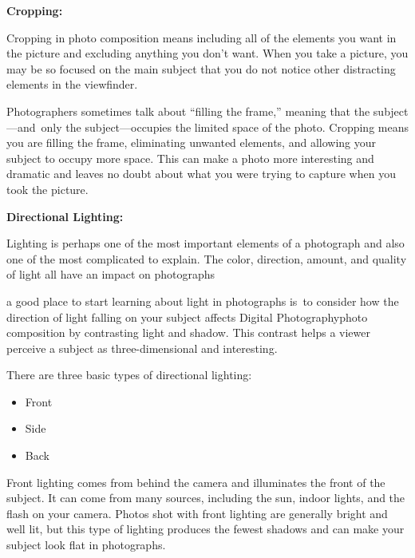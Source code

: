 \documentclass{report}
\begin{document}
    \bigbreak \noindent \bigbreak \noindent 
    \begin{Large}
        \textbf{Cropping:}
    \end{Large}

    \bigbreak \noindent 
    Cropping in photo composition means including all of the elements you want in the picture and excluding anything you don’t want. When you take a picture, you may be so focused on the main subject that you do not notice other distracting elements in the viewfinder.
    
    \bigbreak \noindent 
    Photographers sometimes talk about “filling the frame,” meaning that the subject—and only the subject—occupies the limited space of the photo. Cropping means you are filling the frame, eliminating unwanted elements, and allowing your subject to occupy more space. This can make a photo more interesting and dramatic and leaves no doubt about what you were trying to capture when you took the picture.

    \pagebreak
    \begin{Large}
        \noindent \textbf{Directional Lighting:}
    \end{Large}

    \bigbreak \noindent 
    Lighting is perhaps one of the most important elements of a photograph and also one of the most complicated to explain. The color, direction, amount, and quality of light all have an impact on photographs

    \bigbreak \noindent 
    a good place to start learning about light in photographs is to consider how the direction of light falling on your subject affects Digital Photographyphoto composition by contrasting light and shadow. This contrast helps a viewer perceive a subject as three-dimensional and interesting.

    \bigbreak \noindent 
    There are three basic types of directional lighting:

    \bigbreak \noindent 
    \begin{itemize}
        \item Front
        \item Side
        \item Back
    \end{itemize}

    \bigbreak \noindent 
    Front lighting comes from behind the camera and illuminates the front of the subject. It can come from many sources, including the sun, indoor lights, and the flash on your camera. Photos shot with front lighting are generally bright and well lit, but this type of lighting produces the fewest shadows and can make your subject look flat in photographs.
\end{document}
